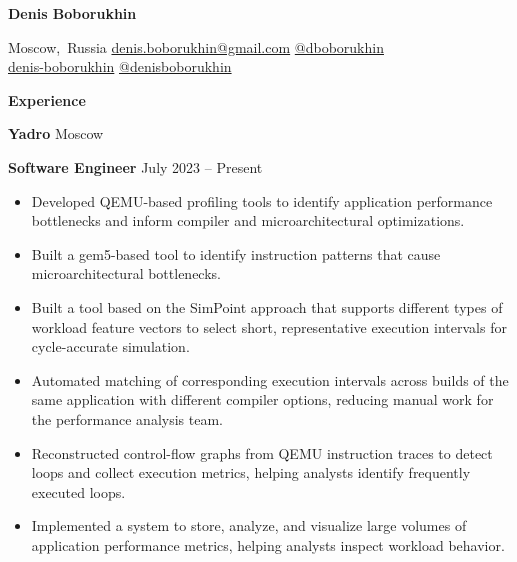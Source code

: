 \documentclass[11pt]{article}
\begin{document}
\begin{center}
  \textbf{Denis Boborukhin}\\
  \hrulefill
\end{center}

\newcommand{\infofield}[2]{\mbox{{\normalsize #1}\hspace{0.5em}#2}}
\newcommand{\email}[1]{\infofield{\faEnvelope}{\href{mailto:#1}{#1}}}
\newcommand{\location}[1]{\infofield{\faMapMarker}{#1}}
\newcommand{\linkedin}[2]{\infofield{\faLinkedin}{\href{#2}{#1}}}
\newcommand{\github}[2]{\infofield{\faGithub}{\href{#2}{#1}}}
\newcommand{\telegram}[2]{\infofield{\faSend}{\href{#2}{#1}}}

\begin{center}
  \location{Moscow, Russia}
  \email{denis.boborukhin@gmail.com}
  \telegram{@dboborukhin}{https://t.me/dboborukhin} \\
  \linkedin{denis-boborukhin}{https://www.linkedin.com/in/denis-boborukhin}
  \github{@denisboborukhin}{https://github.com/denisboborukhin}
\end{center}

\vspace{0.5pt}

\begin{center}
  \textbf{Experience}
\end{center}
\textbf{Yadro} \hfill Moscow

\textbf{Software Engineer} \hfill July 2023 – Present
\begin{itemize}[noitemsep, topsep=0pt, partopsep=0pt, parsep=0pt]
  \item Developed QEMU-based profiling tools to identify application performance bottlenecks and inform
    compiler and microarchitectural optimizations.
  \item Built a gem5-based tool to identify instruction patterns that cause microarchitectural bottlenecks.
  \item Built a tool based on the SimPoint approach that supports different types of workload feature vectors
    to select short, representative execution intervals for cycle-accurate simulation.
  \item Automated matching of corresponding execution intervals across builds of the same application with
    different compiler options, reducing manual work for the performance analysis team.
  \item Reconstructed control-flow graphs from QEMU instruction traces to detect loops and collect
    execution metrics, helping analysts identify frequently executed loops.
  \item Implemented a system to store, analyze, and visualize large volumes of application performance
    metrics, helping analysts inspect workload behavior.
\end{itemize}
\end{document}
